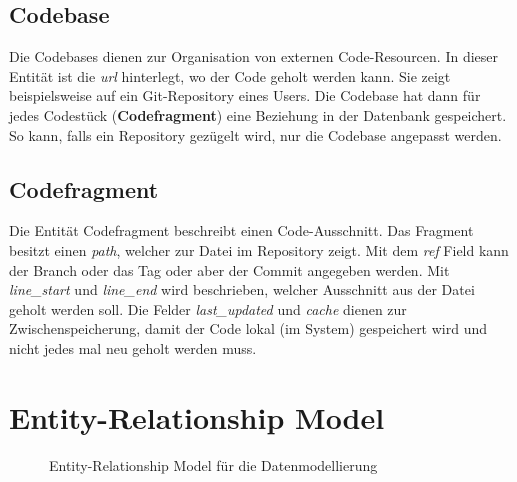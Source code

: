 \subsection{Codebase}
Die Codebases dienen zur Organisation von externen Code-Resourcen. In dieser Entität ist die \emph{url} hinterlegt, wo der Code geholt werden kann. Sie zeigt beispielsweise auf ein Git-Repository eines Users. Die Codebase hat dann für jedes Codestück (\textbf{Codefragment}) eine Beziehung in der Datenbank gespeichert. So kann, falls ein Repository gezügelt wird, nur die Codebase angepasst werden.

\subsection{Codefragment}
Die Entität Codefragment beschreibt einen Code-Ausschnitt. Das Fragment besitzt einen \emph{path}, welcher zur Datei im Repository zeigt. Mit dem \emph{ref} Field kann der Branch oder das Tag oder aber der Commit angegeben werden. Mit \emph{line_start} und \emph{line_end} wird beschrieben, welcher Ausschnitt aus der Datei geholt werden soll. Die Felder \emph{last_updated} und \emph{cache} dienen zur Zwischenspeicherung, damit der Code lokal (im System) gespeichert wird und nicht jedes mal neu geholt werden muss.


\section{Entity-Relationship Model}
\begin{figure}[H]
    \small 
    \caption{Entity-Relationship Model für die Datenmodellierung}
\end{figure}